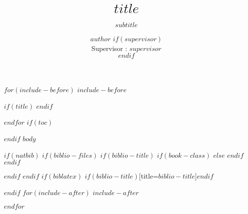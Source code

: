\documentclass[$if(fontsize)$$fontsize$,$else$12pt,$endif$$if(handout)$handout,$endif$$if(beamer)$ignorenonframetext,$endif$$for(classoption)$$classoption$$sep$,$endfor$]{$documentclass$}
\title{$title$}
\subtitle{$subtitle$}
\author[$author$]{\small $author$
$if(supervisor)$
\\ Supervisor : $supervisor$ \\ \vspace{60pt}
$endif$
}
\institute[$institute-short$]{
\large $institute$}
\date{}
\begin{document}
$for(include-before)$
$include-before$

$if(title)$
{
}
$endif$

$endfor$
$if(toc)$
\begin{frame}
\tableofcontents[hideallsubsections]
\end{frame}

$endif$
$body$

$if(natbib)$
$if(biblio-files)$
$if(biblio-title)$
$if(book-class)$
\renewcommand\bibname{$biblio-title$}
$else$
\renewcommand\refname{$biblio-title$}
$endif$
$endif$


$endif$
$endif$
$if(biblatex)$
\printbibliography$if(biblio-title)$[title=$biblio-title$]$endif$

$endif$
$for(include-after)$
$include-after$

$endfor$
\end{document}
